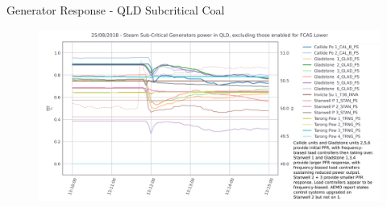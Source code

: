 \begin{frame}{Generator Response - QLD Subcritical Coal }

\begin{figure}
    \centering
    \includegraphics[width=\linewidth]{figures/QLD_Steam Sub-Critical_PU_annotated.png}
    \label{fig:qld_sub}
\end{figure}


\end{frame}
